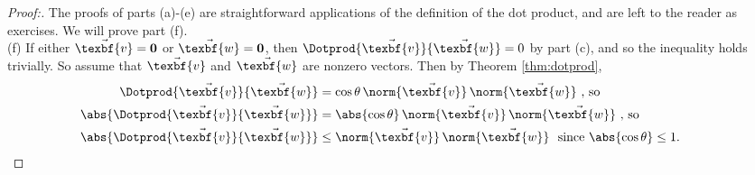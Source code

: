 \begin{proofbar}\vspace{-3mm}\begin{proof}[Proof:]
 The proofs of parts (a)-(e) are straightforward applications of the definition of the dot product, and are left
 to the reader as exercises. We will prove part (f).\\(f)
 If either $\vec{\texbf{v}} = \textbf{0}$ or $\vec{\texbf{w}} = \textbf{0}$, then $\Dotprod{\vec{\texbf{v}}}{\vec{\texbf{w}}} = 0$
 by part (c), and so the inequality holds trivially. So assume that $\vec{\texbf{v}}$ and $\vec{\texbf{w}}$ are nonzero vectors. Then
 by Theorem \ref{thm:dotprod},
 \begin{align*}
  \Dotprod{\vec{\texbf{v}}}{\vec{\texbf{w}}} &= \cos \theta \, \norm{\vec{\texbf{v}}}\,\norm{\vec{\texbf{w}}} \text{~,~so}\\
  \abs{\Dotprod{\vec{\texbf{v}}}{\vec{\texbf{w}}}} &= \abs{\cos \theta} \, \norm{\vec{\texbf{v}}}\,\norm{\vec{\texbf{w}}} \text{~,~so}\\
  \abs{\Dotprod{\vec{\texbf{v}}}{\vec{\texbf{w}}}} &\le \norm{\vec{\texbf{v}}}\,\norm{\vec{\texbf{w}}}
   \text{~~since $\abs{\cos \theta} \le 1$. \qquad \qedhere}
 \end{align*}
\end{proof}\vspace{-3mm}\end{proofbar}

